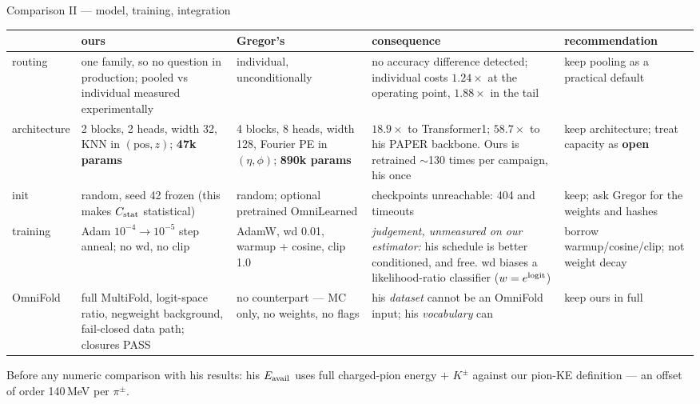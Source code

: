 \documentclass[aspectratio=169,10pt]{beamer}
\newcommand{\ours}[1]{\textcolor{ours}{#1}}
\newcommand{\theirs}[1]{\textcolor{theirs}{#1}}
\newcommand{\warn}[1]{\textcolor{warn}{#1}}
\renewcommand{\arraystretch}{1.12}
\begin{document}
\begin{frame}{Comparison II --- model, training, integration}
  \begin{center}\scriptsize\renewcommand{\arraystretch}{1.0}
  \begin{tabular}{@{}R{0.135\textwidth}R{0.215\textwidth}R{0.215\textwidth}R{0.175\textwidth}R{0.175\textwidth}@{}}
    \toprule
    & \ours{\textbf{ours}} & \theirs{\textbf{Gregor's}} & \textbf{consequence} &
      \textbf{recommendation} \\
    \midrule
    routing &
      one family, so no question in production; pooled vs individual measured
      experimentally &
      individual, unconditionally &
      no accuracy difference detected; individual costs $1.24\times$ at the operating
      point, $1.88\times$ in the tail &
      \ours{keep} pooling as a practical default \\
    architecture &
      2 blocks, 2 heads, width 32, KNN in $(\mathrm{pos},z)$; \textbf{47k params} &
      4 blocks, 8 heads, width 128, Fourier PE in $(\eta,\phi)$; \textbf{890k params} &
      $18.9\times$ to Transformer1; \warn{$58.7\times$ to his PAPER backbone}. Ours is retrained $\sim$130 times per campaign, his once &
      \ours{keep} architecture; treat capacity as \textbf{open} \\
    init &
      random, seed 42 frozen (this makes $C_{\rm stat}$ statistical) &
      random; optional pretrained OmniLearned &
      \warn{checkpoints unreachable}: 404 and timeouts &
      \ours{keep}; ask Gregor for the weights and hashes \\
    training &
      Adam $10^{-4}\!\to\!10^{-5}$ step anneal; no wd, no clip &
      AdamW, wd 0.01, warmup + cosine, clip 1.0 &
      \emph{judgement, unmeasured on our estimator:} his schedule is better
      conditioned, and free. \warn{wd biases a likelihood-ratio
      classifier} ($w=e^{\rm logit}$) &
      \theirs{borrow} warmup/cosine/clip; \warn{not} weight decay \\
    OmniFold &
      full MultiFold, logit-space ratio, negweight background, fail-closed data
      path; closures PASS &
      \warn{no counterpart} --- MC only, no weights, no flags &
      his \emph{dataset} cannot be an OmniFold input; his \emph{vocabulary} can &
      \ours{keep} ours in full \\
    \bottomrule
  \end{tabular}
  \end{center}
  \vspace{0.1em}
  {\scriptsize \warn{Before any numeric comparison with his results:} his $E_{\rm avail}$
  uses full charged-pion energy $+$ $K^{\pm}$ against our pion-KE definition ---
  an offset of order 140\,MeV per $\pi^{\pm}$.}
\end{frame}
\end{document}

